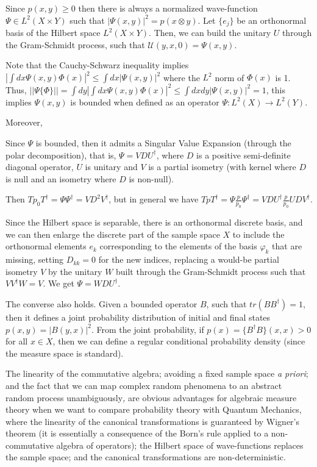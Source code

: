 \documentclass[11pt]{book}
\begin{document}
Since \(p(x, y)\geq 0\) then there is always a normalized wave-function
\(\Psi\in L^2(X\times Y)\) such that \(|\Psi(x,y)|^2=p(x\otimes y)\).
Let \(\{e_j\}\) be an orthonormal basis of the Hilbert space
\(L^2(X\times Y)\). Then, we can build the unitary \(U\) through the
Gram-Schmidt process, such that \(\mathcal{U}(y,x,0)=\Psi(x,y)\).

Note that the Cauchy-Schwarz inequality implies
\(|\int dx \Psi(x,y)\Phi(x) |^2\leq \int dx |\Psi(x,y)|^2\) where the
\(L^2\) norm of \(\Phi(x)\) is 1. Thus,
\(||\Psi\{\Phi\}||=\int dy |\int dx \Psi(x,y)\Phi(x) |^2\leq \int dxdy |\Psi(x,y)|^2=1\),
this implies \(\Psi(x,y)\) is bounded when defined as an operator
\(\Psi:L^2(X)\to L^2(Y)\).

Moreover,

Since \(\Psi\) is bounded, then it admits a Singular Value Expansion
(through the polar decomposition), that is, \(\Psi=V D U^\dagger\),
where \(D\) is a positive semi-definite diagonal operator, \(U\) is
unitary and \(V\) is a partial isometry (with kernel where \(D\) is null
and an isometry where \(D\) is non-null).

Then \(T p_0 T^\dagger=\Psi \Psi^\dagger=V D^2 V^\dagger\), but in
general we have
\(T p T^\dagger=\Psi \frac{p}{p_0}\Psi^\dagger=V D U^\dagger \frac{p}{p_0} U D V^\dagger\).

Since the Hilbert space is separable, there is an orthonormal discrete
basis, and we can then enlarge the discrete part of the sample space
\(X\) to include the orthonormal elements \(e_k\) corresponding to the
elements of the basis \(\varphi_k\) that are missing, setting
\(D_{k k}=0\) for the new indices, replacing a would-be partial isometry
\(V\) by the unitary \(W\) built through the Gram-Schmidt process such
that \(VV^\dagger W=V\). We get \(\Psi=W D U^\dagger\).

The converse also holds. Given a bounded operator \(B\), such that
\(tr(BB^\dagger)=1\), then it defines a joint probability distribution
of initial and final states \(p(x, y)=|B(y,x)|^2\). From the joint
probability, if \(p(x)=\{B^\dagger B\}(x,x)>0\) for all \(x\in X\), then
we can define a regular conditional probability density (since the
measure space is standard).

The linearity of the commutative algebra; avoiding a fixed sample space
\emph{a priori}; and the fact that we can map complex random phenomena
to an abstract random process unambiguously\emph{,} are obvious
advantages for algebraic measure theory when we want to compare
probability theory with Quantum Mechanics, where the linearity of the
canonical transformations is guaranteed by Wigner's theorem (it is
essentially a consequence of the Born's rule applied to a
non-commutative algebra of
operators\cite{Geh_r_2014}\cite{Ruxe4tz1996On}\cite{Molnuxe1r1998algebraic});
the Hilbert space of wave-functions replaces the sample space; and the
canonical transformations are non-deterministic.
\end{document}

